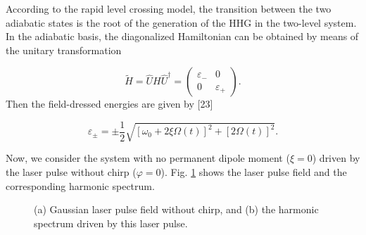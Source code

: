 \documentclass[10pt,letterpaper]{article}
\begin{document}
According to the rapid level crossing model, the transition between the two adiabatic states is the root of the generation of the HHG in the two-level system. In the adiabatic basis, the diagonalized Hamiltonian can be obtained by means of the unitary transformation

\begin{equation}
\tilde H = \hat UH{\hat U^\dag } = \left( {\begin{array}{*{20}{c}}
	{{\varepsilon _ - }}&0\\
	0&{{\varepsilon _ + }}
	\end{array}} \right).
\label{eq14}
\end{equation}
Then the field-dressed energies are given by [23]

\begin{equation}
{\varepsilon _ \pm } =  \pm \frac{1}{2}\sqrt {{{\left[ {{\omega _0} + 2\xi \Omega \left( t \right)} \right]}^2} + {{\left[ {2\Omega \left( t \right)} \right]}^2}}.
\label{eq15}
\end{equation}

Now, we consider the system with no permanent dipole moment ($ \xi=0 $) driven by the laser pulse without chirp ($ \varphi=0 $). Fig. \ref{fig1} shows the laser pulse field and the corresponding harmonic spectrum.

\begin{figure}[!htbp]
	\centering
	\caption{(a) Gaussian laser pulse field without chirp, and (b) the harmonic spectrum driven by this laser pulse.}
	\label{fig1}
\end{figure}
\end{document}
